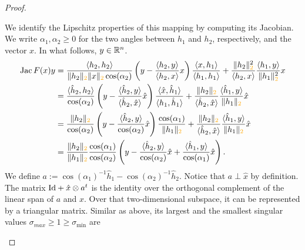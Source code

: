 \documentclass[10pt,letterpaper]{article}
\newcommand\cye[1]{%
  \protect\leavevmode
  \begingroup
    \color{red!35!yellow}%
    #1%
  \endgroup
}
\begin{document}
\begin{proof}
\begin{itemize}
        We identify the Lipschitz properties of this mapping by computing its Jacobian. 
        We write $\alpha_1, \alpha_2 \geq 0$ for the two angles between $h_1$ and $h_2$, respectively, and the vector $x$.
        In what follows, $y \in {\mathbb R}^{n}$.
        \begin{align*}
            \Jacobian F(x) y
            &=
            \frac{ \langle h_2, h_2 \rangle }{ \|h_2\|_{\cye{2}} \|x\|_{\cye{2}} \cos(\alpha_2) }
            \left( y - \frac{ \langle h_2, y \rangle }{ \langle h_2, x \rangle } x \right)
            \frac{ \langle x, h_1 \rangle }{ \langle h_1, h_1 \rangle }
            +
            \frac{ \| h_2 \|_{\cye{2}}^{2} }{ \langle h_2, x \rangle }
            \frac{ \langle h_1, y \rangle }{ \| h_1 \|_{\cye{2}}^{2} }
            x
            \\&=
            \frac{ \langle \hat h_2, h_2 \rangle }{ \cos(\alpha_2) }
            \left( y - \frac{ \langle \hat h_2, y \rangle }{ \langle \hat h_2, \hat x \rangle } \hat x \right)
            \frac{ \langle \hat x, \hat h_1 \rangle }{ \langle h_1, \hat h_1 \rangle }
            +
            \frac{ \| h_2 \|_{\cye{2}} }{ \langle \hat h_2, \hat x \rangle }
            \frac{ \langle \hat h_1, y \rangle }{ \| h_1 \|_{\cye{2}} }
            \hat x
            \\&=
            \frac{ \| h_2 \|_{\cye{2}} }{ \cos(\alpha_2) }
            \left( y - \frac{ \langle \hat h_2, y \rangle }{ \cos(\alpha_2) } \hat x \right)
            \frac{ \cos(\alpha_1) }{ \| h_1 \|_{\cye{2}} }
            +
            \frac{ \| h_2 \|_{\cye{2}} }{ \langle \hat h_2, \hat x \rangle }
            \frac{ \langle \hat h_1, y \rangle }{ \| h_1 \|_{\cye{2}} }
            \hat x
            \\&=
            \frac{ \| h_2 \|_{\cye{2}} }{ \| h_1 \|_{\cye{2}} }
            \frac{ \cos(\alpha_1) }{ \cos(\alpha_2) }
            \left( 
                y 
                - 
                \frac{ \langle \hat h_2, y \rangle }{ \cos(\alpha_2) } \hat x 
                + 
                \frac{ \langle \hat h_1, y \rangle }{ \cos(\alpha_1) } \hat x 
            \right)
            .
        \end{align*}
        We define $a := \cos(\alpha_1)^{-1} \hat h_1 - \cos(\alpha_2)^{-1} \hat h_2$. 
        Notice that $a \perp \hat x$ by definition. The matrix ${\rm Id} + \hat x \otimes a^{t}$ is the identity over the orthogonal complement of the linear span of $a$ and $x$. Over that two-dimensional subspace, it can be represented by a triangular matrix.
        Similar as above, its largest and the smallest singular values $\sigma_{max} \geq 1 \geq \sigma_{\min}$ are

\end{itemize}
\end{proof}
\end{document}
